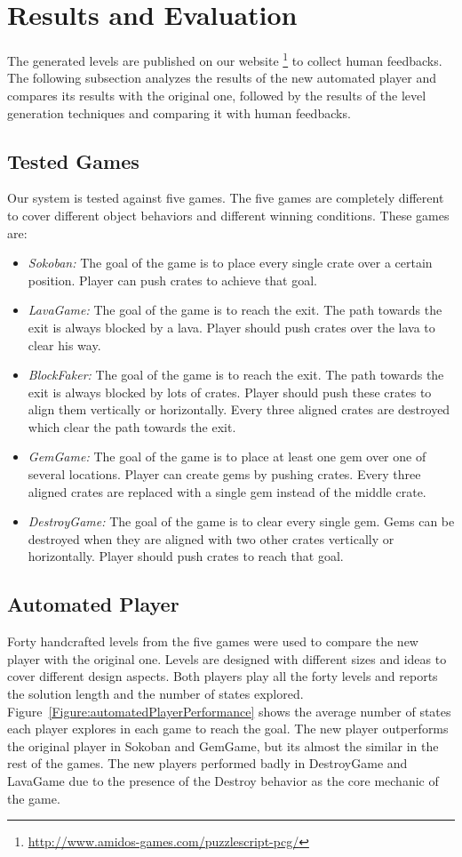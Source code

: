 \documentclass[letterpaper]{article}
\newcommand{\figref}[1]{Figure~\ref{Figure:#1}}
\begin{document}
\section{Results and Evaluation}
The generated levels are published on our website \footnote{\url{http://www.amidos-games.com/puzzlescript-pcg/}} to collect human feedbacks. The following subsection analyzes the results of the new automated player and compares its results with the original one, followed by the results of the level generation techniques and comparing it with human feedbacks.

\subsection{Tested Games}
Our system is tested against five games. The five games are completely different to cover different object behaviors and different winning conditions. These games are:
\begin{itemize} \itemsep0pt \parskip0pt 
	\item \emph{Sokoban:} The goal of the game is to place every single crate over a certain position. Player can push crates to achieve that goal.
	\item \emph{LavaGame:} The goal of the game is to reach the exit. The path towards the exit is always blocked by a lava. Player should push crates over the lava to clear his way.
	\item \emph{BlockFaker:} The goal of the game is to reach the exit. The path towards the exit is always blocked by lots of crates. Player should push these crates to align them vertically or horizontally. Every three aligned crates are destroyed which clear the path towards the exit.
	\item \emph{GemGame:} The goal of the game is to place at least one gem over one of several locations. Player can create gems by pushing crates. Every three aligned crates are replaced with a single gem instead of the middle crate.
	\item \emph{DestroyGame:} The goal of the game is to clear every single gem. Gems can be destroyed when they are aligned with two other crates vertically or horizontally. Player should push crates to reach that goal.
\end{itemize}

\subsection{Automated Player}
Forty handcrafted levels from the five games were used to compare the new player with the original one. Levels are designed with different sizes and ideas to cover different design aspects. Both players play all the forty levels and reports the solution length and the number of states explored. \figref{automatedPlayerPerformance} shows the average number of states each player explores in each game to reach the goal. The new player outperforms the original player in Sokoban and GemGame, but its almost the similar in the rest of the games. The new players performed badly in DestroyGame and LavaGame due to the presence of the Destroy behavior as the core mechanic of the game.\\\par
\end{document}
